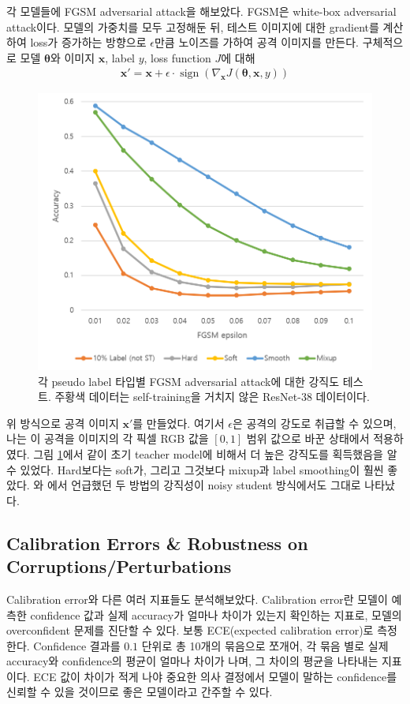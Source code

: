 \documentclass[a4paper, 10pt]{article}
\renewcommand{\vec}{\mathbf}
\begin{document}
각 모델들에 FGSM adversarial attack을 해보았다. FGSM은 white-box adversarial
attack이다. 모델의 가중치를 모두 고정해둔 뒤, 테스트 이미지에 대한 gradient를
계산하여 loss가 증가하는 방향으로 $\epsilon$만큼 노이즈를 가하여 공격 이미지를
만든다. \cite{goodfellow2015explaining} 구체적으로 모델 $\vec \theta$와 이미지
$\vec x$, label $y$, loss function $J$에 대해
\begin{align*} 
  \vec x' = \vec x + \epsilon \cdot \operatorname{sign}(\nabla_{\vec x} J(\vec \theta, \vec x, y))
\end{align*}
\begin{figure}[!htb]
  \centering
  \includegraphics[width=.6\textwidth]{resource/FGSM}
  \caption{각 pseudo label 타입별 FGSM adversarial attack에 대한 강직도 테스트. 주황색 데이터는 self-training을 거치지 않은 ResNet-38 데이터이다.}
  \label{fgsm}
\end{figure}
위 방식으로 공격 이미지 $\vec x'$를 만들었다. 여기서 $\epsilon$은 공격의 강도로
취급할 수 있으며, 나는 이 공격을 이미지의 각 픽셀 RGB 값을 $[0, 1]$ 범위 값으로
바꾼 상태에서 적용하였다.
그림 \ref{fgsm}에서 같이 초기 teacher model에 비해서 더 높은 강직도를 획득했음을
알 수 있었다. Hard보다는 soft가, 그리고 그것보다 mixup과 label smoothing이 훨씬
좋았다. \cite{goibert2019adversarial}와 \cite{zhang2018mixup}에서 언급했던 두
방법의 강직성이 noisy student 방식에서도 그대로 나타났다.

\subsection{Calibration Errors \& Robustness on Corruptions/Perturbations}
Calibration error와 다른 여러 지표들도 분석해보았다. Calibration error란 모델이
예측한 confidence 값과 실제 accuracy가 얼마나 차이가 있는지 확인하는 지표로,
모델의 overconfident 문제를 진단할 수 있다. \cite{guo2017calibration} 보통
ECE(expected calibration error)로 측정한다. Confidence 결과를 $0.1$ 단위로 총
10개의 묶음으로 쪼개어, 각 묶음 별로 실제 accuracy와 confidence의 평균이 얼마나
차이가 나며, 그 차이의 평균을 나타내는 지표이다. ECE 값이 차이가 적게 나야
중요한 의사 결정에서 모델이 말하는 confidence를 신뢰할 수 있을 것이므로 좋은
모델이라고 간주할 수 있다.
\end{document}
